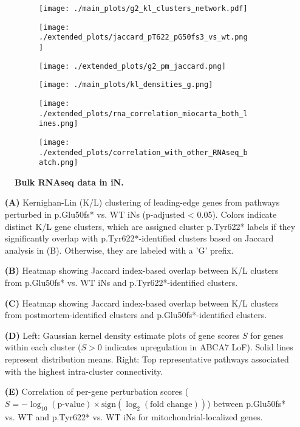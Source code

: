 \begin{figure}[H]
    \begin{subfigure}[t]{.3\textwidth}
        \caption{}
        \texttt{[image: ./main\_plots/g2\_kl\_clusters\_network.pdf]}        
    \end{subfigure}
    \begin{subfigure}[t]{.3\textwidth}
        \caption{}
        \texttt{[image: ./extended\_plots/jaccard\_pT622\_pG50fs3\_vs\_wt.png]}        
    \end{subfigure}
    \begin{subfigure}[t]{.3\textwidth}
        \caption{}
        \texttt{[image: ./extended\_plots/g2\_pm\_jaccard.png]}        
    \end{subfigure}
    \begin{subfigure}[t]{.3\textwidth}
        \caption{}
        \texttt{[image: ./main\_plots/kl\_densities\_g.png]}        
    \end{subfigure}
    \begin{subfigure}[t]{.3\textwidth}
        \caption{}
        \texttt{[image: ./extended\_plots/rna\_correlation\_miocarta\_both\_lines.png]}        
    \end{subfigure}
    \begin{subfigure}[t]{.3\textwidth}
        \caption{}
        \texttt{[image: ./extended\_plots/correlation\_with\_other\_RNAseq\_batch.png]}        
    \end{subfigure}
    \caption{
        \textbf{Bulk RNAseq data in iN.}\\
    }
    \label{fig:bulk_RNAseq_supplement}
\end{figure}
\begin{itemize}
    \item[\textbf{(A)}] Kernighan-Lin (K/L) clustering of leading-edge genes from pathways perturbed in p.Glu50fs* vs. WT iNs (p-adjusted < 0.05). Colors indicate distinct K/L gene clusters, which are assigned cluster p.Tyr622* labels if they significantly overlap with p.Tyr622*-identified clusters based on Jaccard analysis in (B). Otherwise, they are labeled with a 'G' prefix.
    \item[\textbf{(B)}] Heatmap showing Jaccard index-based overlap between K/L clusters from p.Glu50fs* vs. WT iNs and p.Tyr622*-identified clusters.
    \item[\textbf{(C)}] Heatmap showing Jaccard index-based overlap between K/L clusters from postmortem-identified clusters and p.Glu50fs*-identified clusters.
    \item[\textbf{(D)}] Left: Gaussian kernel density estimate plots of gene scores $S$ for genes within each cluster ($S>0$ indicates upregulation in ABCA7 LoF). Solid lines represent distribution means. Right: Top representative pathways associated with the highest intra-cluster connectivity.
    \item[\textbf{(E)}] Correlation of per-gene perturbation scores ($S = -\log_{10}(\text{p-value}) \times \text{sign}(\log_2(\text{fold change}))$) between p.Glu50fs* vs. WT and p.Tyr622* vs. WT iNs for mitochondrial-localized genes.
\end{itemize}